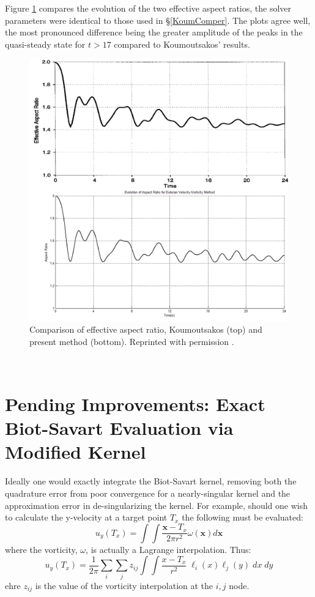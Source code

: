 \documentclass[]{aiaa-tc}%
\newcommand{\be}{\begin{equation}}
\newcommand{\ee}{\end{equation}}
\begin{document}
Figure \ref{fig:AspectRatio} compares the evolution of the two effective aspect ratios, the solver parameters were identical to those used in \S\ref{KoumComper}. The plots agree well, the most pronounced difference being the greater amplitude of the peaks in the quasi-steady state for $t>17$ compared to Koumoutsakos' results.
\begin{figure}
\centering
\includegraphics[width=1\textwidth]{AspectRatio.PNG}
\caption{\label{fig:AspectRatio}Comparison of effective aspect ratio, Koumoutsakos \cite{Koum1997} (top) and present method (bottom). Reprinted with permission \cite{KoumLic}.}
\end{figure}\\

\section{Pending Improvements: Exact Biot-Savart Evaluation via Modified Kernel }

Ideally one would exactly integrate the Biot-Savart kernel, removing both the quadrature error from poor convergence for a nearly-singular kernel and the approximation error in de-singularizing the kernel. For example, should one wish to calculate the y-velocity at a target point $T_x$ the following must be evaluated:
\be u_y(T_x) = \int \int \frac{\mathbf{x}-T_x}{2\pi r^2} \omega(\mathbf{x}) d\mathbf{x} \ee
where the vorticity, $\omega$, is actually a Lagrange interpolation. Thus:
\be u_y(T_x) = \frac{1}{2 \pi} \sum_i \sum_j z_{ij} \int \int \frac{x-T_x}{r^2} \; \ell_i(x) \ell_j(y) \;dx \;dy\ee
ehre $z_{ij}$ is the value of the vorticity interpolation at the $i,j$ node.
\end{document}
